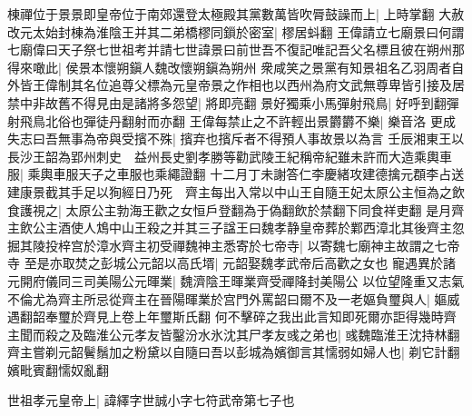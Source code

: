 棟禪位于景景即皇帝位于南郊還登太極殿其黨數萬皆吹脣鼓譟而上|{
	上時掌翻}
大赦改元太始封棟為淮陰王并其二弟橋樛同鎻於密室|{
	樛居蚪翻}
王偉請立七廟景曰何謂七廟偉曰天子祭七世祖考并請七世諱景曰前世吾不復記唯記吾父名標且彼在朔州那得來噉此|{
	侯景本懷朔鎭人魏改懷朔鎭為朔州}
衆咸笑之景黨有知景祖名乙羽周者自外皆王偉制其名位追尊父標為元皇帝景之作相也以西州為府文武無尊卑皆引接及居禁中非故舊不得見由是諸將多怨望|{
	將即亮翻}
景好獨乘小馬彈射飛鳥|{
	好呼到翻彈射飛鳥北俗也彈徒丹翻射而亦翻}
王偉每禁止之不許輕出景欝欝不樂|{
	樂音洛}
更成失志曰吾無事為帝與受擯不殊|{
	擯弃也擯斥者不得預人事故景以為言}
壬辰湘東王以長沙王韶為郢州刺史　益州長史劉孝勝等勸武陵王紀稱帝紀雖未許而大造乘輿車服|{
	乘輿車服天子之車服也乘繩證翻}
十二月丁未謝答仁李慶緒攻建德擒元頵李占送建康景截其手足以狥經日乃死　齊主每出入常以中山王自隨王妃太原公主恒為之飲食護視之|{
	太原公主勃海王歡之女恒戶登翻為于偽翻飲於禁翻下同食祥吏翻}
是月齊主飲公主酒使人鴆中山王殺之并其三子諡王曰魏孝静皇帝葬於鄴西漳北其後齊主忽掘其陵投梓宫於漳水齊主初受禪魏神主悉寄於七帝寺|{
	以寄魏七廟神主故謂之七帝寺}
至是亦取焚之彭城公元韶以高氏壻|{
	元韶娶魏孝武帝后高歡之女也}
寵遇異於諸元開府儀同三司美陽公元暉業|{
	魏濟陰王暉業齊受禪降封美陽公}
以位望隆重又志氣不倫尤為齊主所忌從齊主在晉陽暉業於宫門外罵韶曰爾不及一老嫗負璽與人|{
	嫗威遇翻韶奉璽於齊見上卷上年璽斯氏翻}
何不擊碎之我出此言知即死爾亦詎得幾時齊主聞而殺之及臨淮公元孝友皆鑿汾水氷沈其尸孝友彧之弟也|{
	彧魏臨淮王沈持林翻}
齊主嘗剃元韶鬢鬚加之粉黛以自隨曰吾以彭城為嬪御言其懦弱如婦人也|{
	剃它計翻嬪毗賓翻懦奴亂翻}


世祖孝元皇帝上|{
	諱繹字世誠小字七符武帝第七子也}


